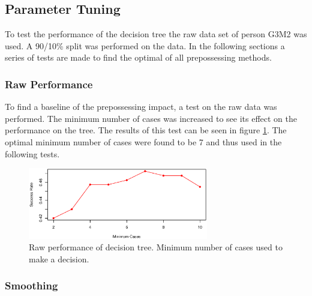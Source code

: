 \subsection{Parameter Tuning}

To test the performance of the decision tree the raw data set of person G3M2 was used.
A 90/10\% split was performed on the data.
In the following sections a series of tests are made to find the optimal of all prepossessing methods.

% 
% 
% 
% 
% 
% 

\subsubsection{Raw Performance}

To find a baseline of the prepossessing impact, a test on the raw data was performed.
The minimum number of cases was increased to see its effect on the performance on the tree.
The results of this test can be seen in figure \ref{fig:tree_raw}. 
The optimal minimum number of cases were found to be 7 and thus used in the following tests.

\begin{figure}[H]
\centering
\includegraphics[width=0.7\textwidth]{graphics/tree_raw}
\caption[Success for decision tree with no prepossessing used.]{Raw performance of decision tree. Minimum number of cases used to make a decision. }%
\label{fig:tree_raw}
\end{figure}


\subsubsection{Smoothing}

